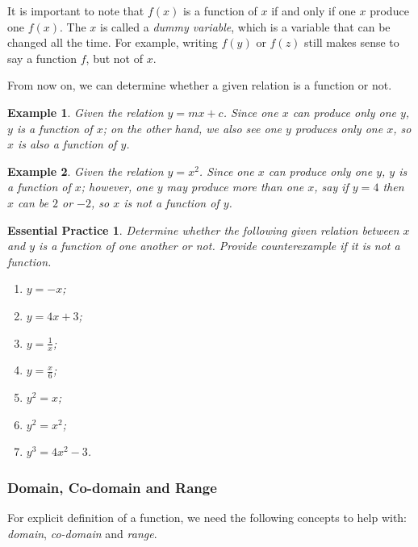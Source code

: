 \documentclass[12pt]{article}
\newtheorem*{example}{Example}
\newtheorem{exercise}{Essential Practice}[subsubsection]
\begin{document}
    It is important to note that $f(x)$ is a function of $x$ if and only if one $x$ produce one $f(x)$. The $x$ is called a \textit{dummy variable}, which is a variable that can be changed all the time. For example, writing $f(y)$ or $f(z)$ still makes sense to say a function $f$, but not of $x$.

    From now on, we can determine whether a given relation is a function or not.

    \begin{example}
        Given the relation $y=mx+c$. Since one $x$ can produce only one $y$, $y$ is a function of $x$; on the other hand, we also see one $y$ produces only one $x$, so $x$ is also a function of $y$.
    \end{example}

    \begin{example}
        Given the relation $y=x^2$. Since one $x$ can produce only one $y$, $y$ is a function of $x$; however,  one $y$ may produce more than one $x$, say if $y=4$ then $x$ can be $2$ or $-2$, so $x$ is not a function of $y$.
    \end{example}

    \begin{exercise}
        Determine whether the following given relation between $x$ and $y$ is a function of one another or not. Provide counterexample if it is not a function.\begin{enumerate}
            \item $y=-x$;
            \item $y=4x+3$;
            \item $y=\frac{1}{x}$;
            \item $y=\frac{x}{6}$;
            \item $y^2=x$;
            \item $y^2=x^2$;
            \item $y^3=4x^2-3$.
        \end{enumerate}
    \end{exercise}
    \subsubsection{Domain, Co-domain and Range}

    For explicit definition of a function, we need the following concepts to help with: \textit{domain}, \textit{co-domain} and \textit{range}.
\end{document}

